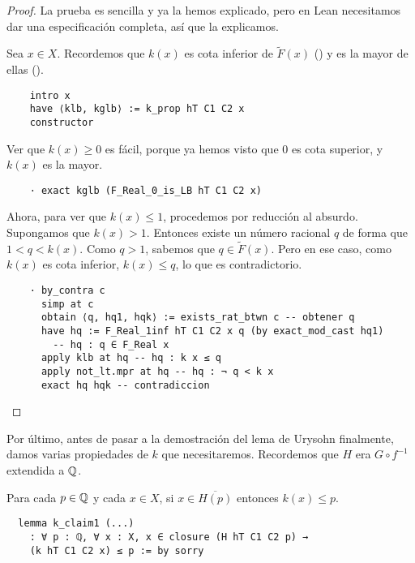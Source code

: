 \begin{proof}
  La prueba es sencilla y ya la hemos explicado, pero en Lean necesitamos dar una especificación completa, así que la explicamos.

  Sea $x \in X$. Recordemos que $k(x)$ es cota inferior de $\tilde{F}(x)$ () y es la mayor de ellas ().

  \begin{lstlisting}
    intro x
    have ⟨klb, kglb⟩ := k_prop hT C1 C2 x
    constructor \end{lstlisting}

  Ver que $k(x) \geq 0$ es fácil, porque ya hemos visto que $0$ es cota superior, y $k(x)$ es la mayor.

  \begin{lstlisting}
    · exact kglb (F_Real_0_is_LB hT C1 C2 x) \end{lstlisting}

  Ahora, para ver que $k(x) \leq 1$, procedemos por reducción al absurdo. Supongamos que $k(x) > 1$. Entonces existe un número racional $q$ de forma que $1 < q < k(x)$. Como $q > 1$, sabemos que $q \in \tilde{F}(x)$. Pero en ese caso, como $k(x)$ es cota inferior, $k(x) \leq q$, lo que es contradictorio.

  \begin{lstlisting}
    · by_contra c
      simp at c
      obtain ⟨q, hq1, hqk⟩ := exists_rat_btwn c -- obtener q
      have hq := F_Real_1inf hT C1 C2 x q (by exact_mod_cast hq1)
        -- hq : q ∈ F_Real x
      apply klb at hq -- hq : k x ≤ q
      apply not_lt.mpr at hq -- hq : ¬ q < k x
      exact hq hqk -- contradiccion \end{lstlisting}
\end{proof}

Por último, antes de pasar a la demostración del lema de Urysohn finalmente, damos varias propiedades de $k$ que necesitaremos. Recordemos que $H$ era $G \circ f^{-1}$ extendida a $\mathbb{Q}$.

\begin{lemma}\label{claim1}
  Para cada $p \in \mathbb{Q}$ y cada $x \in X$, si $x \in \overline{H(p)}$ entonces $k(x) \leq p$.
\end{lemma}

\begin{lstlisting}
  lemma k_claim1 (...)
    : ∀ p : ℚ, ∀ x : X, x ∈ closure (H hT C1 C2 p) →
    (k hT C1 C2 x) ≤ p := by sorry
\end{lstlisting}

